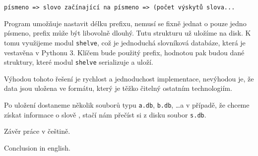 \documentclass[12pt]{article}
\newcommand{\code}[1]{\texttt{#1}}
\begin{document}
\begin{verbatim}
písmeno => slovo začínající na písmeno => (počet výskytů slova...
\end{verbatim}

Program umožňuje nastavit délku prefixu, nemusí se fixně jednat o pouze jedno písmeno, prefix může být libovolně dlouhý. Tutu strukturu už uložíme na disk. K tomu využijeme modul \code{shelve}, což je jednoduchá slovníková databáze, která je vestavěna v Pythonu 3. Klíčem bude použitý prefix, hodnotou pak budou dané struktury, které modul \code{shelve} serializuje a uloží. 

Výhodou tohoto řešení je rychlost a jednoduchost implementace, nevýhodou je, že data jsou uložena ve formátu, který je těžko čitelný ostatním technologiím. 

Po uložení dostaneme několik souborů typu \code{a.db}, \code{b.db}, \dots a v případě, že chceme získat informace o slově , stačí nám přečíst si z disku soubor \code{s.db}. 





\begin{conclusions-cz}
  Závěr práce v češtině.
\end{conclusions-cz}


\begin{conclusions-en}
  Conclusion in english.
\end{conclusions-en}
\end{document}
